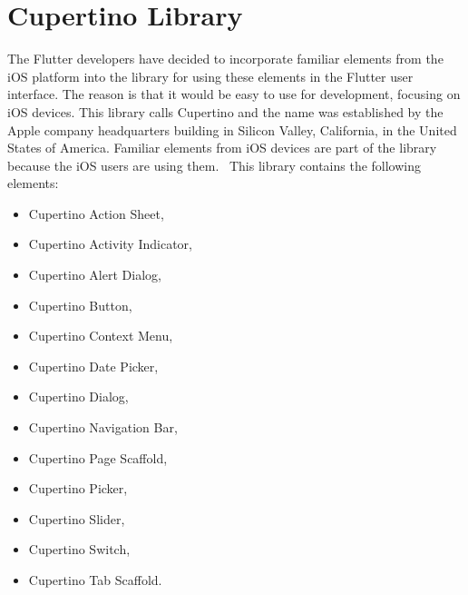 \section{Cupertino Library}\label{sec:ios-specific-ui-widgets}
The Flutter developers have decided to incorporate familiar elements from the iOS platform into the library for using these elements in the Flutter user interface.
The reason is that it would be easy to use for development, focusing on iOS devices.
This library calls Cupertino and the name was established by the Apple company headquarters building in Silicon Valley, California, in the United States of America.
Familiar elements from iOS devices are part of the library because the iOS users are using them.~\cite{cupertino}
This library contains the following elements:
\begin{itemize}
    \item Cupertino Action Sheet,
    \item Cupertino Activity Indicator,
    \item Cupertino Alert Dialog,
    \item Cupertino Button,
    \item Cupertino Context Menu,
    \item Cupertino Date Picker,
    \item Cupertino Dialog,
    \item Cupertino Navigation Bar,
    \item Cupertino Page Scaffold,
    \item Cupertino Picker,
    \item Cupertino Slider,
    \item Cupertino Switch,
    \item Cupertino Tab Scaffold.
\end{itemize}
